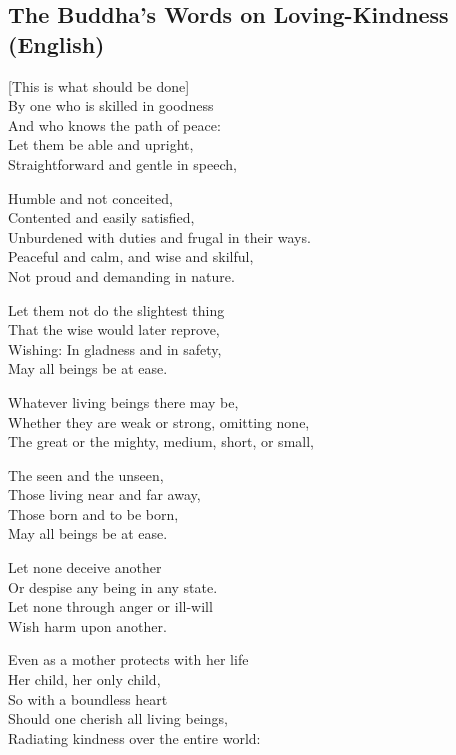 \subsection{The Buddha's Words on Loving-Kindness (English)}

\begin{leader}
\end{leader}


[This is what should be done]\\
By one who is skilled in goodness\\
And who knows the path of peace:\\
Let them be able and upright,\\
Straightforward and gentle in speech,

Humble and not conceited,\\
Contented and easily satisfied,\\
Unburdened with duties and frugal in their ways.\\
Peaceful and calm, and wise and skilful,\\
Not proud and demanding in nature.

Let them not do the slightest thing\\
That the wise would later reprove,\\
Wishing: In gladness and in safety,\\
May all beings be at ease.

Whatever living beings there may be,\\
Whether they are weak or strong, omitting none,\\
The great or the mighty, medium, short, or small,

The seen and the unseen,\\
Those living near and far away,\\
Those born and to be born,\\
May all beings be at ease.

Let none deceive another\\
Or despise any being in any state.\\
Let none through anger or ill-will\\
Wish harm upon another.

Even as a mother protects with her life\\
Her child, her only child,\\
So with a boundless heart\\
Should one cherish all living beings,\\
Radiating kindness over the entire world:

